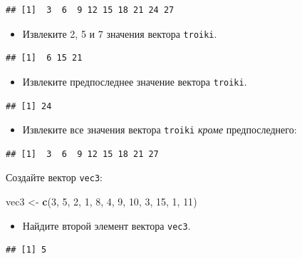 \documentclass[]{book}
\newenvironment{Shaded}{\begin{snugshade}}{\end{snugshade}}
\newcommand{\KeywordTok}[1]{\textcolor[rgb]{0.13,0.29,0.53}{\textbf{#1}}}
\newcommand{\DecValTok}[1]{\textcolor[rgb]{0.00,0.00,0.81}{#1}}
\newcommand{\StringTok}[1]{\textcolor[rgb]{0.31,0.60,0.02}{#1}}
\newcommand{\NormalTok}[1]{#1}
\providecommand{\tightlist}{%
  \setlength{\itemsep}{0pt}\setlength{\parskip}{0pt}}
\begin{document}
\begin{verbatim}
## [1]  3  6  9 12 15 18 21 24 27
\end{verbatim}

\begin{itemize}
\tightlist
\item
  Извлеките 2, 5 и 7 значения вектора \texttt{troiki}.
\end{itemize}

\begin{verbatim}
## [1]  6 15 21
\end{verbatim}

\begin{itemize}
\tightlist
\item
  Извлеките предпоследнее значение вектора \texttt{troiki}.
\end{itemize}

\begin{verbatim}
## [1] 24
\end{verbatim}

\begin{itemize}
\tightlist
\item
  Извлеките все значения вектора \texttt{troiki} \emph{кроме}
  предпоследнего:
\end{itemize}

\begin{verbatim}
## [1]  3  6  9 12 15 18 21 27
\end{verbatim}

Создайте вектор \texttt{vec3}:

\begin{Shaded}
\begin{Highlighting}[]
\NormalTok{vec3 <-}\StringTok{ }\KeywordTok{c}\NormalTok{(}\DecValTok{3}\NormalTok{, }\DecValTok{5}\NormalTok{, }\DecValTok{2}\NormalTok{, }\DecValTok{1}\NormalTok{, }\DecValTok{8}\NormalTok{, }\DecValTok{4}\NormalTok{, }\DecValTok{9}\NormalTok{, }\DecValTok{10}\NormalTok{, }\DecValTok{3}\NormalTok{, }\DecValTok{15}\NormalTok{, }\DecValTok{1}\NormalTok{, }\DecValTok{11}\NormalTok{)}
\end{Highlighting}
\end{Shaded}

\begin{itemize}
\tightlist
\item
  Найдите второй элемент вектора \texttt{vec3}.
\end{itemize}

\begin{verbatim}
## [1] 5
\end{verbatim}
\end{document}
